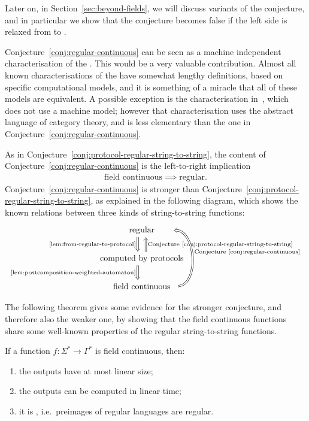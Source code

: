 Later on, in Section~\ref{sec:beyond-fields}, we will discuss variants of the
conjecture, and in particular we show that the conjecture becomes false if the
left side is relaxed from  to .

Conjecture~\ref{conj:regular-continuous} can be seen as a machine independent
characterisation of the . This would be
a very valuable contribution. Almost all known characterisations of the
 have somewhat lengthy definitions,
based on specific computational models, and it is something of a miracle that
all of these models are equivalent. A possible exception is the
characterisation in~\cite{bojanczykTitoRegular23}, which does not use a machine
model; however that characterisation uses the abstract language of category
theory, and is less elementary than the one in
Conjecture~\ref{conj:regular-continuous}.

As in Conjecture~\ref{conj:protocol-regular-string-to-string}, the content of Conjecture~\ref{conj:regular-continuous} is the left-to-right implication
\begin{align*}
\text{field continuous} \implies \text{regular}.
\end{align*}
Conjecture~\ref{conj:regular-continuous} is stronger than Conjecture~\ref{conj:protocol-regular-string-to-string}, as explained in the following diagram, which shows the known relations between three kinds of string-to-string functions:
\[
\begin{tikzcd}
\text{~~~~regular~~~~}
\ar[d,Rightarrow,shift right=2, "\text{\cref{lem:from-regular-to-protocol}}"']
\\
\text{computed by protocols}
\ar[d,Rightarrow, shift right=2, "\text{\cref{lem:postcomposition-weighted-automaton}}"']
\ar[u,Rightarrow, shift right=2,"\text{Conjecture~\ref{conj:protocol-regular-string-to-string}}"']
\\ 
\text{field continuous} 
\ar[uu,bend right=89, Rightarrow, shift right=2,"\text{Conjecture~\ref{conj:regular-continuous}}"']
\end{tikzcd}
\]


The following theorem gives some evidence for the stronger conjecture,  and
therefore also the weaker one, by showing that the field continuous functions
share some well-known properties of the regular string-to-string functions. 

\begin{theorem}\label{thm:evidence-for-the-conjecture}
    If a function $f : \Sigma^* \to \Gamma^*$ is  field continuous, then:
    \begin{enumerate}
        \item \label{it:linear-size-outputs} the outputs have at most linear size;
        \item \label{it:linear-time-computable} the outputs can be computed in linear time;
        \item \label{it:regular-preimages} it is , i.e.~preimages of regular languages are regular.
    \end{enumerate}
\end{theorem}

